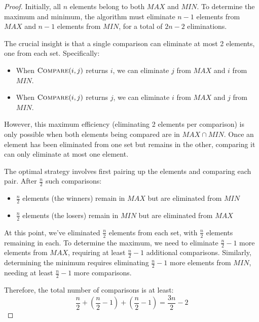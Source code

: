 \documentclass[letterpaper, 11pt]{article}
\newcommand{\1}{\mathds{1}}	%
\theoremstyle{definition}
\newenvironment{solution}{{\par\noindent\it Solution.}}{}
\begin{document}
\begin{solution}
\begin{proof}
Initially, all $n$ elements belong to both $MAX$ and $MIN$. To determine the maximum and minimum, the algorithm must eliminate $n-1$ elements from $MAX$ and $n-1$ elements from $MIN$, for a total of $2n-2$ eliminations.

The crucial insight is that a single comparison can eliminate at most 2 elements, one from each set. Specifically:
\begin{itemize}
    \item When $\textsc{Compare}(i,j)$ returns $i$, we can eliminate $j$ from $MAX$ and $i$ from $MIN$.
    \item When $\textsc{Compare}(i,j)$ returns $j$, we can eliminate $i$ from $MAX$ and $j$ from $MIN$.
\end{itemize}

However, this maximum efficiency (eliminating 2 elements per comparison) is only possible when both elements being compared are in $MAX \cap MIN$. Once an element has been eliminated from one set but remains in the other, comparing it can only eliminate at most one element.

The optimal strategy involves first pairing up the elements and comparing each pair. After $\frac{n}{2}$ such comparisons:
\begin{itemize}
    \item $\frac{n}{2}$ elements (the winners) remain in $MAX$ but are eliminated from $MIN$
    \item $\frac{n}{2}$ elements (the losers) remain in $MIN$ but are eliminated from $MAX$
\end{itemize}

At this point, we've eliminated $\frac{n}{2}$ elements from each set, with $\frac{n}{2}$ elements remaining in each. To determine the maximum, we need to eliminate $\frac{n}{2}-1$ more elements from $MAX$, requiring at least $\frac{n}{2}-1$ additional comparisons. Similarly, determining the minimum requires eliminating $\frac{n}{2}-1$ more elements from $MIN$, needing at least $\frac{n}{2}-1$ more comparisons.

Therefore, the total number of comparisons is at least:
$$\frac{n}{2} + \left(\frac{n}{2}-1\right) + \left(\frac{n}{2}-1\right) = \frac{3n}{2} - 2$$
                \end{proof}
\end{solution}
\end{document}
